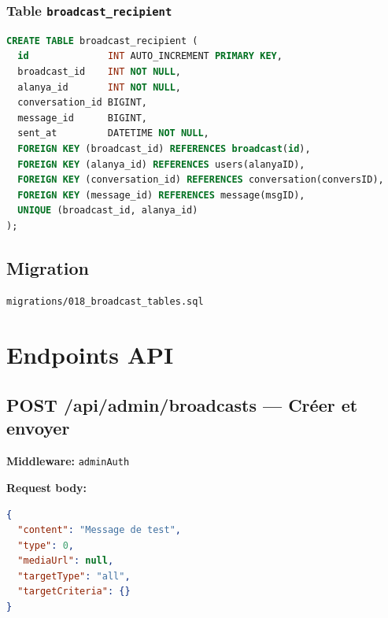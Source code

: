 \documentclass{article}
\begin{document}
\subsubsection{Table \texttt{broadcast\_recipient}}
\begin{lstlisting}[language=SQL]
CREATE TABLE broadcast_recipient (
  id              INT AUTO_INCREMENT PRIMARY KEY,
  broadcast_id    INT NOT NULL,
  alanya_id       INT NOT NULL,
  conversation_id BIGINT,
  message_id      BIGINT,
  sent_at         DATETIME NOT NULL,
  FOREIGN KEY (broadcast_id) REFERENCES broadcast(id),
  FOREIGN KEY (alanya_id) REFERENCES users(alanyaID),
  FOREIGN KEY (conversation_id) REFERENCES conversation(conversID),
  FOREIGN KEY (message_id) REFERENCES message(msgID),
  UNIQUE (broadcast_id, alanya_id)
);
\end{lstlisting}

\subsection{Migration}
\begin{lstlisting}[language=bash]
migrations/018_broadcast_tables.sql
\end{lstlisting}

\section{Endpoints API}

\subsection{POST /api/admin/broadcasts --- Créer et envoyer}

\textbf{Middleware:} \texttt{adminAuth}

\textbf{Request body:}
\begin{lstlisting}[language=JSON]
{
  "content": "Message de test",
  "type": 0,
  "mediaUrl": null,
  "targetType": "all",
  "targetCriteria": {}
}
\end{lstlisting}
\end{document}

